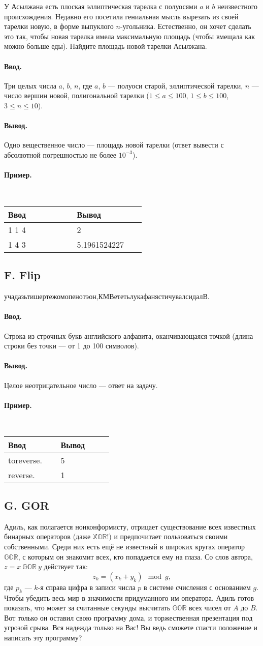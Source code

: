 \documentclass[10pt, a5paper]{article}
\newcommand{\informat}[1]
{
	\paragraph{Ввод.\\} #1
}
\newcommand{\outformat}[1]
{
	\paragraph{Вывод.\\} #1
}
\newcommand{\examplee}[4]
{
	\paragraph{Пример.\\}
	{\tt
	\begin{tabular}{|p{0.4\linewidth}|p{0.4\linewidth}|}
	\hline
	Ввод 	& Вывод  	\\
	\hline
	#1 		& #2 		\\
	\hline
	#3		& #4		\\
	\hline
	\end{tabular}
	}
}
\begin{document}
У Асылжана есть плоская эллиптическая тарелка с полуосями $a$ и $b$ неизвестного происхождения. Недавно его посетила гениальная мысль вырезать из своей тарелки новую, в форме выпуклого $n$-угольника. Естественно, он хочет сделать это так, чтобы новая тарелка имела максимальную площадь (чтобы вмещала как можно больше еды). Найдите площадь новой тарелки Асылжана.

\informat{Три целых числа $a$, $b$, $n$, где $a$, $b$ --- полуоси старой, эллиптической тарелки, $n$ --- число вершин новой, полигональной тарелки ($1 \le a \le 100$, $1 \le b \le 100$, $3 \le n \le 10$).}

\outformat{Одно вещественное число --- площадь новой тарелки (ответ вывести с абсолютной погрешностью не более $10^{-3}$).}

\examplee{1 1 4}{2}{1 4 3}{5.1961524227}



\subsection*{F. Flip}

учадазьтишертежомопенотэон,КМВететьлукафанястичувалсидалВ.

\informat{Строка из строчных букв английского алфавита, оканчивающаяся точкой (длина строки без точки --- от 1 до 100 символов).}

\outformat{Целое неотрицательное число --- ответ на задачу.}

\examplee{toreverse.}{5}{reverse.}{1}



\subsection*{G. GOR}

Адиль, как полагается нонконформисту, отрицает существование всех известных бинарных операторов (даже $\mathbb{XOR}$!) и предпочитает пользоваться своими собственными. Среди них есть ещё не известный в широких кругах оператор $\mathbb{GOR}$, с которым он знакомит всех, кто попадается ему на глаза. Со слов автора, $z = x \ \mathbb{GOR} \ y$ действует так:
$$z_k = (x_k + y_k) \mod g, $$ 
где $p_k$ --- $k$-я справа цифра в записи числа $p$ в системе счисления с основанием $g$. Чтобы убедить весь мир в значимости придуманного им оператора, Адиль готов показать, что может за считанные секунды высчитать $\mathbb{GOR}$ всех чисел от $A$ до $B$. Вот только он оставил свою программу дома, и торжественная презентация под угрозой срыва. Вся надежда только на Вас! Вы ведь сможете спасти положение и написать эту программу?
\end{document}
